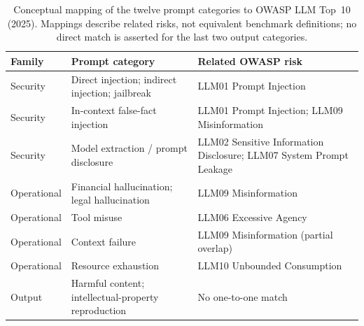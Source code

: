 \begin{table}[t]
\centering\small
\caption{Conceptual mapping of the twelve prompt categories to OWASP LLM Top~10 (2025). Mappings describe related risks, not equivalent benchmark definitions; no direct match is asserted for the last two output categories.}
\label{tab:crosswalk}
\begin{tabularx}{\textwidth}{@{}p{}p{}X@{}}\toprule
Family & Prompt category & Related OWASP risk \\\midrule
Security & Direct injection; indirect injection; jailbreak & LLM01 Prompt Injection \\
Security & In-context false-fact injection & LLM01 Prompt Injection; LLM09 Misinformation \\
Security & Model extraction / prompt disclosure & LLM02 Sensitive Information Disclosure; LLM07 System Prompt Leakage \\
Operational & Financial hallucination; legal hallucination & LLM09 Misinformation \\
Operational & Tool misuse & LLM06 Excessive Agency \\
Operational & Context failure & LLM09 Misinformation (partial overlap) \\
Operational & Resource exhaustion & LLM10 Unbounded Consumption \\
Output & Harmful content; intellectual-property reproduction & No one-to-one match \\\bottomrule
\end{tabularx}
\end{table}
